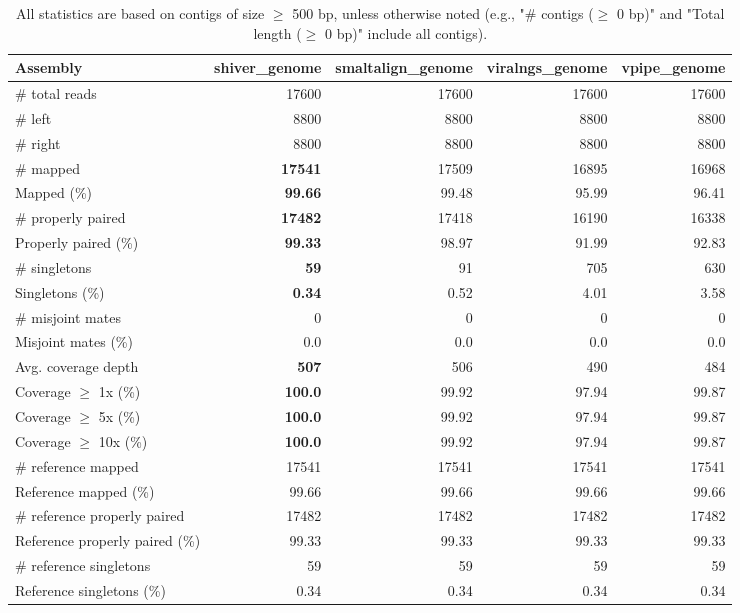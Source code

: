 \documentclass[12pt,a4paper]{article}
\begin{document}
\begin{table}[ht]
\begin{center}
\caption{All statistics are based on contigs of size $\geq$ 500 bp, unless otherwise noted (e.g., "\# contigs ($\geq$ 0 bp)" and "Total length ($\geq$ 0 bp)" include all contigs).}
\begin{tabular}{|l*{4}{|r}|}
\hline
Assembly & shiver\_genome & smaltalign\_genome & viralngs\_genome & vpipe\_genome \\ \hline
\# total reads & 17600 & 17600 & 17600 & 17600 \\ \hline
\# left & 8800 & 8800 & 8800 & 8800 \\ \hline
\# right & 8800 & 8800 & 8800 & 8800 \\ \hline
\# mapped & {\bf 17541} & 17509 & 16895 & 16968 \\ \hline
Mapped (\%) & {\bf 99.66} & 99.48 & 95.99 & 96.41 \\ \hline
\# properly paired & {\bf 17482} & 17418 & 16190 & 16338 \\ \hline
Properly paired (\%) & {\bf 99.33} & 98.97 & 91.99 & 92.83 \\ \hline
\# singletons & {\bf 59} & 91 & 705 & 630 \\ \hline
Singletons (\%) & {\bf 0.34} & 0.52 & 4.01 & 3.58 \\ \hline
\# misjoint mates & 0 & 0 & 0 & 0 \\ \hline
Misjoint mates (\%) & 0.0 & 0.0 & 0.0 & 0.0 \\ \hline
Avg. coverage depth & {\bf 507} & 506 & 490 & 484 \\ \hline
Coverage $\geq$ 1x (\%) & {\bf 100.0} & 99.92 & 97.94 & 99.87 \\ \hline
Coverage $\geq$ 5x (\%) & {\bf 100.0} & 99.92 & 97.94 & 99.87 \\ \hline
Coverage $\geq$ 10x (\%) & {\bf 100.0} & 99.92 & 97.94 & 99.87 \\ \hline
\# reference mapped & 17541 & 17541 & 17541 & 17541 \\ \hline
Reference mapped (\%) & 99.66 & 99.66 & 99.66 & 99.66 \\ \hline
\# reference properly paired & 17482 & 17482 & 17482 & 17482 \\ \hline
Reference properly paired (\%) & 99.33 & 99.33 & 99.33 & 99.33 \\ \hline
\# reference singletons & 59 & 59 & 59 & 59 \\ \hline
Reference singletons (\%) & 0.34 & 0.34 & 0.34 & 0.34 \\ \hline

\end{tabular}
\end{center}
\end{table}
\end{document}

